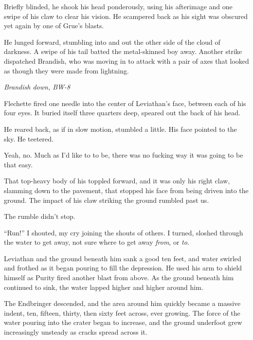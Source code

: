 Briefly blinded, he shook his head ponderously, using his afterimage and one swipe of his claw to clear his vision.  He scampered back as his sight was obscured yet again by one of Grue's blasts.



He lunged forward, stumbling into and out the other side of the cloud of darkness.  A swipe of his tail batted the metal-skinned boy away.  Another strike dispatched Brandish, who was moving in to attack with a pair of axes that looked as though they were made from lightning.



\emph{Brandish down, BW-8}



Flechette fired one needle into the center of Leviathan's face, between each of his four eyes.  It buried itself three quarters deep, speared out the back of his head.



He reared back, as if in slow motion, stumbled a little.  His face pointed to the sky.  He teetered.



Yeah, no.  Much as I'd like to to be, there was no fucking way it was going to be that easy.



That top-heavy body of his toppled forward, and it was only his right claw, slamming down to the pavement, that stopped his face from being driven into the ground.  The impact of his claw striking the ground rumbled past us.



The rumble didn't stop.



``Run!'' I shouted, my cry joining the shouts of others.  I turned, sloshed through the water to get away, not sure where to get away \emph{from}, or \emph{to}.



Leviathan and the ground beneath him sank a good ten feet, and water swirled and frothed as it began pouring to fill the depression.  He used his arm to shield himself as Purity fired another blast from above.  As the ground beneath him continued to sink, the water lapped higher and higher around him.



The Endbringer descended, and the area around him quickly became a massive indent, ten, fifteen, thirty, then sixty feet across, ever growing.  The force of the water pouring into the crater began to increase, and the ground underfoot grew increasingly unsteady as cracks spread across it.



